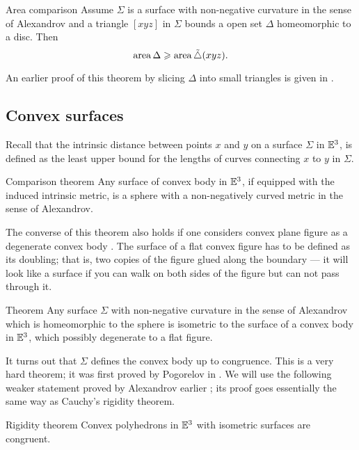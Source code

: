 \documentclass[oneside,a4paper, 12pt]{article}
\begin{document}
\begin{thm}{Area comparison}\label{Area comparison}
Assume $\Sigma$ is a surface with non-negative curvature in the sense of Alexandrov
and a triangle $[xyz]$ in $\Sigma$ bounds a open set $\Delta$ homeomorphic to a disc.
Then 
\[\mathop{\rm area}\nolimits\Delta\geqslant \mathop{\rm area}\nolimits\tilde\triangle(xyz).\]
\end{thm}
An earlier proof of this theorem by slicing $\Delta$ into small triangles is given in \cite[X \S 1]{ aleksandrov1948vnutrennnyaya}.

\subsection*{Convex surfaces}

Recall that the intrinsic distance between points $x$ and $y$ on a surface $\Sigma$ in $\mathbb{E}^3$, is defined as the least upper bound for the lengths of curves connecting $x$ to $y$ in $\Sigma$.

\begin{thm}{Comparison theorem}\label{Comparison theorem}
Any surface of convex body in $\mathbb{E}^3$,
if equipped with the induced intrinsic metric, 
is a sphere with a non-negatively curved metric in the sense of Alexandrov.
\end{thm}

The converse of this theorem also holds
if one considers convex plane figure as a degenerate convex body \cite[III \S 3]{aleksandrov1948vnutrennnyaya}.
The surface of a flat convex figure has to be defined as its doubling;
that is, two copies 
of the figure glued along the boundary --- it will look like a surface if you can walk on both sides of the figure but can not pass through it.

\begin{thm}{Theorem}
Any surface $\Sigma$ with non-negative curvature in the sense of Alexandrov which is homeomorphic to the sphere
is isometric to the surface of a convex body in $\mathbb{E}^3$,
which possibly degenerate to a flat figure.
\end{thm}

It turns out that $\Sigma$ defines the convex body up to congruence.
This is a very hard theorem;
it was first proved by Pogorelov in \cite{pogorelov1952odnoznacnaya}.
We will use the following weaker statement proved by Alexandrov earlier 
\cite[VI \S 5]{aleksandrov1948vnutrennnyaya};
its proof goes essentially the same way as Cauchy's rigidity theorem.

\begin{thm}{Rigidity theorem}\label{Rigidity theorem}
Convex polyhedrons in $\mathbb{E}^3$ with isometric surfaces are congruent. 
\end{thm}
\end{document}

